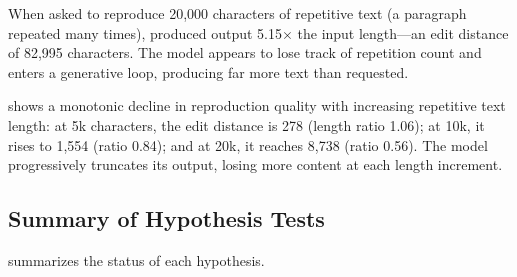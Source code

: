 When asked to reproduce 20,000 characters of repetitive text (a paragraph repeated many times), \gptmini produced output 5.15$\times$ the input length---an edit distance of 82,995 characters. The model appears to lose track of repetition count and enters a generative loop, producing far more text than requested.

\gptomini shows a monotonic decline in reproduction quality with increasing repetitive text length: at 5k characters, the edit distance is 278 (length ratio 1.06); at 10k, it rises to 1,554 (ratio 0.84); and at 20k, it reaches 8,738 (ratio 0.56). The model progressively truncates its output, losing more content at each length increment.

\subsection{Summary of Hypothesis Tests}

 summarizes the status of each hypothesis.

\begin{table}[t]
    \centering
    \caption{Summary of hypothesis testing. Each hypothesis is evaluated against the experimental evidence.}
    \label{tab:hypotheses}
\end{table}
